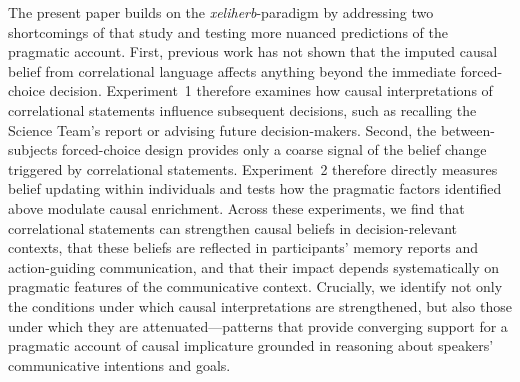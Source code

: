 \documentclass[10pt,letterpaper]{article}
\begin{document}
The present paper builds on the \textit{xeliherb}-paradigm by addressing two shortcomings of that study and testing more nuanced predictions of the pragmatic account.
%
First, previous work has not shown that the imputed causal belief from correlational language affects anything beyond the immediate forced-choice decision.
Experiment~1 therefore examines how causal interpretations of correlational statements influence subsequent decisions, such as recalling the Science Team's report or advising future decision-makers.
%
Second, the between-subjects forced-choice design provides only a coarse signal of the belief change triggered by correlational statements.
Experiment~2 therefore directly measures belief updating within individuals and tests how the pragmatic factors identified above modulate causal enrichment.
Across these experiments, we find that correlational statements can strengthen causal beliefs in decision-relevant contexts, that these beliefs are reflected in participants' memory reports and action-guiding communication, and that their impact depends systematically on pragmatic features of the communicative context.
Crucially, we identify not only the conditions under which causal interpretations are strengthened, but also those under which they are attenuated—patterns that provide converging support for a pragmatic account of causal implicature grounded in reasoning about speakers' communicative intentions and goals.
\end{document}
